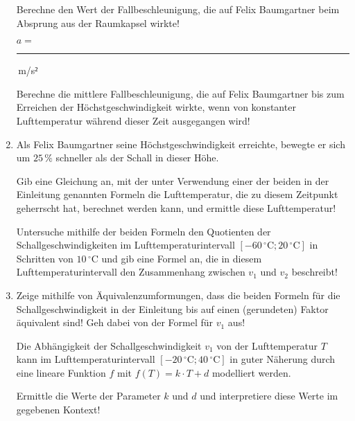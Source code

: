 \begin{langesbeispiel}
\begin{enumerate}
	Berechne den Wert der Fallbeschleunigung, die auf Felix Baumgartner beim Absprung aus der Raumkapsel wirkte!\leer
	
	$a=$ \rule{3cm}{0.3pt}\,m/s$²$\leer
	
	Berechne die mittlere Fallbeschleunigung, die auf Felix Baumgartner bis zum Erreichen der Höchstgeschwindigkeit wirkte, wenn von konstanter Lufttemperatur während dieser Zeit ausgegangen wird!\leer
	
	\item Als Felix Baumgartner seine Höchstgeschwindigkeit erreichte, bewegte er sich um $25\,\%$ schneller als der Schall in dieser Höhe.\leer
	
	Gib eine Gleichung an, mit der unter Verwendung einer der beiden in der Einleitung genannten Formeln die Lufttemperatur, die zu diesem Zeitpunkt geherrscht hat, berechnet werden kann, und ermittle diese Lufttemperatur!\leer
	
	Untersuche mithilfe der beiden Formeln den Quotienten der Schallgeschwindigkeiten im Lufttemperaturintervall $[-60\,^\circ\text{C}; 20\,^\circ\text{C}]$ in Schritten von $10\,^\circ\text{C}$ und gib eine Formel an, die in diesem Lufttemperaturintervall den Zusammenhang zwischen $v_1$ und $v_2$ beschreibt!\leer
	
	\item Zeige mithilfe von Äquivalenzumformungen, dass die beiden Formeln für die Schallgeschwindigkeit in der Einleitung bis auf einen (gerundeten) Faktor äquivalent sind! Geh dabei von der Formel für $v_1$ aus!\leer
	
	Die Abhängigkeit der Schallgeschwindigkeit $v_1$ von der Lufttemperatur $T$ kann im Lufttemperaturintervall $[-20\,^\circ\text{C}; 40\,^\circ\text{C}]$ in guter Näherung durch eine lineare Funktion $f$ mit $f(T)=k\cdot T+d$ modelliert werden.
	
	Ermittle die Werte der Parameter $k$ und $d$ und interpretiere diese Werte im gegebenen Kontext!
	
\end{enumerate}

\end{langesbeispiel}
